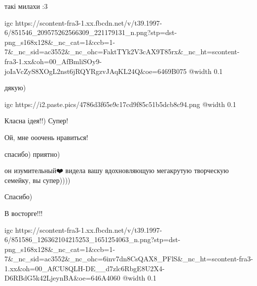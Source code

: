  
 
 
 
 

\qqSecCmt


такі милахи :3

\ifcmt
  igc https://scontent-fra3-1.xx.fbcdn.net/v/t39.1997-6/851546_209575262566309_221179131_n.png?stp=dst-png_s168x128&_nc_cat=1&ccb=1-7&_nc_sid=ac3552&_nc_ohc=FaktTYk2V3cAX9T85rx&_nc_ht=scontent-fra3-1.xx&oh=00_AfBmliSOy9-joIaVcZyS8XOgL2nst6jRQYRgzvJAqKL24Q&oe=6469B075
  @width 0.1
\fi

\begin{itemize} %
дякую)
\end{itemize} %


\ifcmt
  igc https://i2.paste.pics/4786d3f65e9c17cd9f85c51b5dcb8c94.png
  @width 0.1
\fi


Класна ідея!!) Супер!


Ой, мне ооочень нравиться!

\begin{itemize} %
спасибо) приятно)
\end{itemize} %


он изумительный❤️ видела вашу вдохновляющую мегакрутую творческую семейку, вы супер))))


Спасибо)


В восторге!!!


\ifcmt
  igc https://scontent-fra3-1.xx.fbcdn.net/v/t39.1997-6/851586_126362104215253_1651254063_n.png?stp=dst-png_s168x128&_nc_cat=1&ccb=1-7&_nc_sid=ac3552&_nc_ohc=6inv7dn8CsQAX8_PFlS&_nc_ht=scontent-fra3-1.xx&oh=00_AfCU8QLH-DE__d7zlc6RbgE8U2X4-D6RBdG5k42LjeynBA&oe=646A4060
  @width 0.1
\fi

